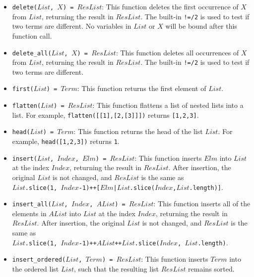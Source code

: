 \begin{itemize}
\item \texttt{delete($List$, $X$) = $ResList$}: This function deletes the first occurrence of $X$ from $List$, returning the result in $ResList$. The built-in \verb+!=/2+ is used to test if two terms are different. No variables in $List$ or $X$ will be bound after this function call.
\item \texttt{delete\_all($List$, $X$) = $ResList$}: This function deletes all occurrences of $X$ from $List$, returning the result in $ResList$. The built-in \verb+!=/2+ is used to test if two terms are different.
\item \texttt{first($List$) = $Term$}: This function returns the first element of $List$. 
\item \texttt{flatten($List$) = $ResList$}: This function flattens a list of nested lists into a list. For example, \texttt{flatten([[1],[2,[3]]])} returns \texttt{[1,2,3]}.
\item \texttt{head($List$) = $Term$}: This function returns the head of the list $List$. For example, \texttt{head([1,2,3])} returns \texttt{1}.
\item \texttt{insert($List$, $Index$, $Elm$) = $ResList$}: This function inserts $Elm$ into $List$ at the index $Index$, returning the result in $ResList$. After insertion, the original $List$ is not changed, and $ResList$ is the same as \\ \texttt{$List$.slice(1, $Index$-1)++[$Elm$|$List$.slice($Index$,$List$.length)]}.
\item \texttt{insert\_all($List$, $Index$, $AList$) = $ResList$}: This function inserts all of the elements in $AList$ into $List$ at the index $Index$, returning the result in $ResList$. After insertion, the original $List$ is not changed, and $ResList$ is the same as \\ \texttt{$List$.slice(1, $Index$-1)++$AList$++$List$.slice($Index$, $List$.length)}.

\item \texttt{insert\_ordered($List$, $Term$) = $ResList$}: This function inserts $Term$ into the ordered list $List$, such that the resulting list $ResList$ remains sorted.


\end{itemize}
